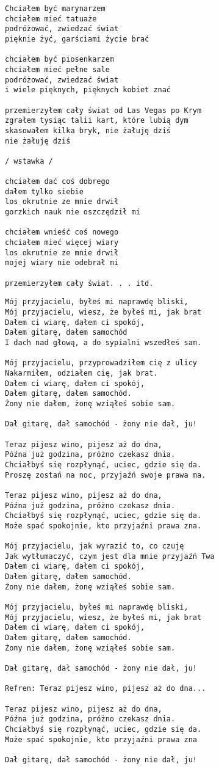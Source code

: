 \documentclass[12pt]{article}
\begin{document}
\begin{verbatim}
Chciałem być marynarzem
chciałem mieć tatuaże
podróżować, zwiedzać świat
pięknie żyć, garściami życie brać

chciałem być piosenkarzem
chciałem mieć pełne sale
podróżować, zwiedzać świat
i wiele pięknych, pięknych kobiet znać

przemierzyłem cały świat od Las Vegas po Krym
zgrałem tysiąc talii kart, które lubią dym
skasowałem kilka bryk, nie żałuję dziś
nie żałuję dziś

/ wstawka /

chciałem dać coś dobrego
dałem tylko siebie
los okrutnie ze mnie drwił
gorzkich nauk nie oszczędził mi

chciałem wnieść coś nowego
chciałem mieć więcej wiary
los okrutnie ze mnie drwił
mojej wiary nie odebrał mi

przemierzyłem cały świat. . . itd.
\end{verbatim}
\clearpage

\begin{verbatim}
Mój przyjacielu, byłeś mi naprawdę bliski,
Mój przyjacielu, wiesz, że byłeś mi, jak brat
Dałem ci wiarę, dałem ci spokój,
Dałem gitarę, dałem samochód
I dach nad głową, a do sypialni wszedłeś sam.

Mój przyjacielu, przyprowadziłem cię z ulicy
Nakarmiłem, odziałem cię, jak brat.
Dałem ci wiarę, dałem ci spokój,
Dałem gitarę, dałem samochód.
Żony nie dałem, żonę wziąłeś sobie sam.

Dał gitarę, dał samochód - żony nie dał, ju!

Teraz pijesz wino, pijesz aż do dna,
Późna już godzina, próżno czekasz dnia.
Chciałbyś się rozpłynąć, uciec, gdzie się da.
Proszę zostań na noc, przyjaźń swoje prawa ma.

Teraz pijesz wino, pijesz aż do dna,
Późna już godzina, próżno czekasz dnia.
Chciałbyś się rozpłynąć, uciec, gdzie się da.
Może spać spokojnie, kto przyjaźni prawa zna.

Mój przyjacielu, jak wyrazić to, co czuję
Jak wytłumaczyć, czym jest dla mnie przyjaźń Twa
Dałem ci wiarę, dałem ci spokój,
Dałem gitarę, dałem samochód.
Żony nie dałem, żonę wziąłeś sobie sam.

Mój przyjacielu, byłeś mi naprawdę bliski,
Mój przyjacielu, wiesz, że byłeś mi, jak brat
Dałem ci wiarę, dałem ci spokój,
Dałem gitarę, dałem samochód.
Żony nie dałem, żonę wziąłeś sobie sam.

Dał gitarę, dał samochód - żony nie dał, ju!

Refren: Teraz pijesz wino, pijesz aż do dna...

Teraz pijesz wino, pijesz aż do dna,
Późna już godzina, próżno czekasz dnia.
Chciałbyś się rozpłynąć, uciec, gdzie się da.
Może spać spokojnie, kto przyjaźni prawa zna

Dał gitarę, dał samochód - żony nie dał, ju!
\end{verbatim}
\clearpage
\end{document}
